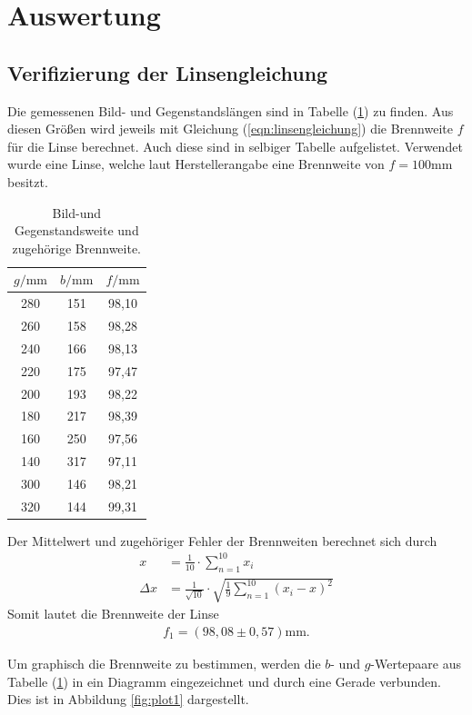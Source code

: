 \section{Auswertung}
\label{sec:Auswertung}

\subsection{Verifizierung der Linsengleichung}
Die gemessenen Bild- und Gegenstandslängen sind in Tabelle (\ref{tab:einzel1}) zu finden. Aus diesen Größen wird jeweils mit Gleichung (\ref{eqn:linsengleichung})
die Brennweite $f$ für  die Linse berechnet. Auch diese sind in selbiger Tabelle aufgelistet.
Verwendet wurde eine Linse, welche laut Herstellerangabe eine Brennweite von $f = 100\si{\milli\meter}$ besitzt.
\begin{table}[H]
\centering
\caption{Bild-und Gegenstandsweite und zugehörige Brennweite.}
\label{tab:einzel1}
\begin{tabular}{c c c}
\toprule
$g/\si{\milli\meter}$ & $b/\si{\milli\meter}$ & $f/\si{\milli\meter}$\\
\midrule
280  &	151 & 98,10 \\ 
260  &	158 & 98,28 \\
240  &	166 & 98,13 \\
220  &	175 & 97,47 \\
200  &	193 & 98,22 \\
180  &	217 & 98,39 \\
160  &	250 & 97,56 \\
140  &	317 & 97,11 \\
300  &	146 & 98,21 \\
320  &	144 & 99,31 \\
\bottomrule
\end{tabular}
\end{table}

Der Mittelwert und zugehöriger Fehler der Brennweiten berechnet sich durch
\begin{align*}
x &= \frac{1}{10}\cdot \sum_{n=1}^{10} x_i\\
\Delta x &=\frac{1}{\sqrt{10}} \cdot \sqrt{\frac{1}{9} \sum_{n=1}^{10} (x_i - x)^2} 
\end{align*}
Somit lautet die Brennweite der Linse
\begin{align*}
f_1 = (98,08 \pm 0,57) \si{\milli\meter} .
\end{align*}

Um graphisch die Brennweite zu bestimmen, werden die $b$- und $g$-Wertepaare aus Tabelle (\ref{tab:einzel1}) in ein Diagramm eingezeichnet und durch eine Gerade verbunden.
Dies ist in Abbildung \ref{fig:plot1} dargestellt.

